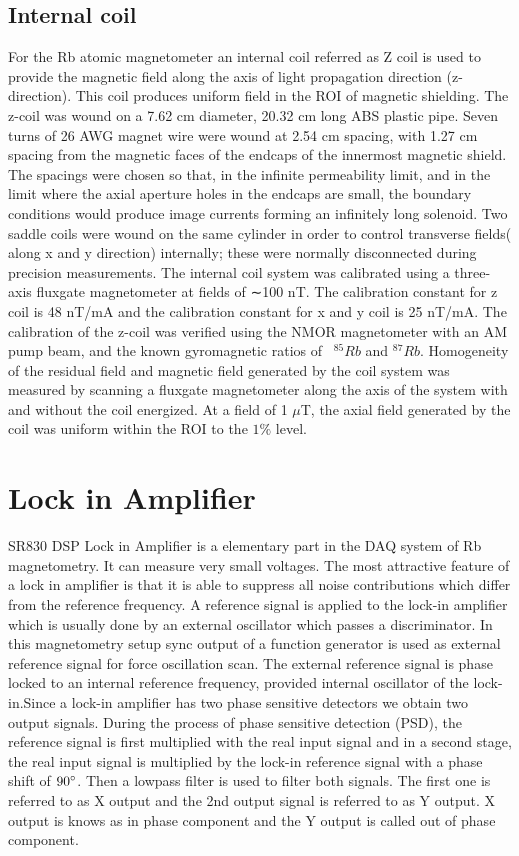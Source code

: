 \subsection{Internal coil\label{sec:Internal coil}}
 For the Rb atomic magnetometer an internal coil referred as Z coil is used to provide the magnetic field along the axis of light propagation direction (z-direction). This coil produces uniform field in the ROI  of magnetic shielding. The z-coil was wound on a 7.62 cm diameter, 20.32 cm long ABS plastic pipe. Seven turns of 26 AWG magnet wire were wound at 2.54 cm spacing, with 1.27 cm spacing from the magnetic faces of the endcaps of the innermost magnetic shield. The spacings were chosen so that, in the infinite permeability limit, and in the limit where the axial aperture holes in the endcaps are small, the boundary conditions would produce image currents forming an infinitely long solenoid. Two saddle coils were wound on the same cylinder in order to control transverse fields( along x and y direction) internally; these were normally disconnected during precision measurements. The internal coil system was calibrated using a three-axis fluxgate magnetometer at fields of ∼100 nT.  The calibration constant for z coil is 48 nT/mA and the calibration constant for x and y coil is 25 nT/mA. The calibration of the z-coil was verified using the NMOR magnetometer with an AM pump beam, and the known gyromagnetic ratios of~ $^{85}Rb$ and $^{87}Rb$. Homogeneity of the residual field and magnetic field generated by the coil system was measured by scanning a fluxgate magnetometer along the axis of the system with and without the coil energized. At a field of 1 $\mu$T, the axial field generated by the coil was uniform within the ROI to the $1\%$  level.


\section{Lock in Amplifier}
SR830 DSP Lock in Amplifier is a elementary part in the DAQ system of Rb magnetometry. It can measure very  small voltages. The most attractive feature of a lock in amplifier is that it is able to suppress all noise contributions which differ from the reference frequency. A reference signal is applied to the lock-in amplifier which is usually done by an external oscillator which passes a discriminator. In this magnetometry setup sync output of a function generator is used as external reference signal for force oscillation scan. The external reference signal is phase locked to an internal reference frequency, provided internal oscillator of the lock-in.Since a lock-in amplifier has two phase sensitive detectors we obtain two output signals. During the process of phase sensitive detection (PSD), the reference signal is first multiplied with the real input signal  and in a second stage, the real input signal is multiplied by
the lock-in reference signal with a phase shift of $90\degree$. Then a lowpass filter is used to filter both signals. The first one is referred to as X output and the 2nd output signal is referred to as Y output. X output is knows as in phase component and the Y output is called out of phase component.


